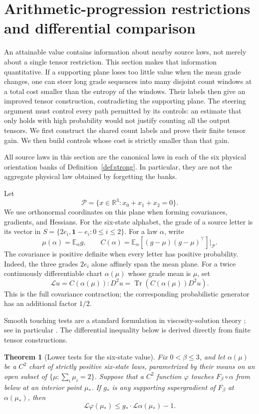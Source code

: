 \documentclass[11pt]{article}
\numberwithin{equation}{section}
\newtheorem{theorem}{Theorem}[section]
\theoremstyle{definition}
\theoremstyle{remark}
\begin{document}
\section{Arithmetic-progression restrictions and differential comparison}
\label{ap:section}

An attainable value contains information about nearby source laws, not merely
about a single tensor restriction.  This section makes that information
quantitative.  If a supporting plane loses too little value when the mean
grade changes, one can steer long grade sequences into many disjoint count
windows at a total cost smaller than the entropy of the windows.  Their
labels then give an improved tensor construction, contradicting the supporting
plane.  The steering argument must control every path permitted by its controls:
an estimate that only holds with high probability would not justify counting
all the output tensors.  We first construct the shared count labels and
prove their finite tensor gain.  We then build controls whose cost is
strictly smaller than that gain.

All source laws in this section are the canonical laws in each of the six
physical orientation banks of Definition~\ref{def:strong}.  In particular,
they are not the aggregate physical law obtained by forgetting the banks.

Let
\[
 \mathcal P=\{x\in\mathbb R^3:x_0+x_1+x_2=0\}.
\]
We use orthonormal coordinates on this plane when forming covariances,
gradients, and Hessians.  For the six-state alphabet, the grade of a source
letter is its vector in
\(S=\{2e_i,\boldsymbol 1-e_i:0\leq i\leq2\}\).
For a law \(\alpha\), write
\[
 \mu(\alpha)=\mathbb E_\alpha g,
 \qquad
 C(\alpha)=\mathbb E_\alpha[(g-\mu)(g-\mu)^\top]\big|_{\mathcal P}.
\]
The covariance is positive definite when every letter has positive
probability.  Indeed, the three grades \(2e_i\) alone affinely span the mean
plane.  For a twice continuously differentiable chart \(\alpha(\mu)\)
whose grade mean is \(\mu\), set
\[
 \mathcal L u=C(\alpha(\mu)):D^2u
              =\operatorname{Tr}(C(\alpha(\mu))D^2u).
\]
This is the full covariance contraction; the corresponding probabilistic
generator has an additional factor \(1/2\).

Smooth touching tests are a standard formulation in viscosity-solution
theory \cite{crandalllions1983}; see in particular
\cite[Section~2]{crandallishiilions1992}.  The differential inequality
below is derived directly from finite tensor constructions.

\begin{theorem}[Lower tests for the six-state value]\label{thm:ap}
Fix \(0<\beta\leq3\), and let \(\alpha(\mu)\) be a \(C^2\) chart of
strictly positive six-state laws, parametrized by their means on an open
subset of \(\{\mu:\sum_i\mu_i=2\}\).  Suppose that a \(C^2\) function
\(\varphi\) touches \(F_\beta\circ\alpha\) from below at an interior
point \(\mu_*\).  If \(g_*\) is any supporting supergradient of
\(F_\beta\) at \(\alpha(\mu_*)\), then
\begin{equation}\label{ap:lower-test}
 \mathcal L\varphi(\mu_*)
 \leq g_*\cdot\mathcal L\alpha(\mu_*)-1.
\end{equation}
\end{theorem}
\end{document}
